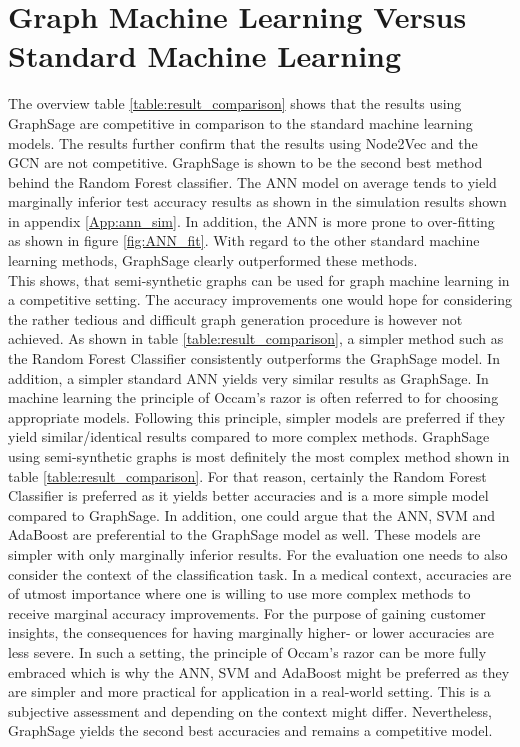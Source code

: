   \section{Graph Machine Learning Versus Standard Machine Learning}

  The overview table \ref{table:result_comparison} shows that the results using 
  GraphSage are competitive in comparison to the standard machine learning
  models. The results further confirm that the results using Node2Vec and the 
  GCN are not competitive. GraphSage is shown to be the second best method 
  behind the Random Forest classifier. The ANN model on average tends to yield 
  marginally inferior test accuracy results as shown in the simulation results 
  shown in appendix \ref{App:ann_sim}. In addition, the ANN is more prone to 
  over-fitting as shown in figure \ref{fig:ANN_fit}. With regard to the other 
  standard machine learning methods, GraphSage clearly outperformed these methods. \\

  \noindent This shows, that semi-synthetic graphs can be used for graph 
  machine learning in a competitive setting. The accuracy improvements one would 
  hope for considering the rather tedious and difficult graph generation 
  procedure is however not achieved. As shown in table 
  \ref{table:result_comparison}, a simpler method such as the Random Forest 
  Classifier consistently outperforms the GraphSage model. In addition, a
  simpler standard ANN yields very similar results as GraphSage. In machine 
  learning the principle of Occam's razor is often referred to for choosing 
  appropriate models. Following this principle, simpler models are preferred if 
  they yield similar/identical results compared to more complex methods.
  GraphSage using semi-synthetic graphs is most definitely the most complex 
  method shown in table \ref{table:result_comparison}. For that reason, certainly 
  the Random Forest Classifier is preferred as it yields better accuracies and
  is a more simple model compared to GraphSage. In addition, one could argue
  that the ANN, SVM and AdaBoost are preferential to the GraphSage model as
  well. These models are simpler with only marginally inferior results. For
  the evaluation one needs to also consider the context of the classification
  task. In a medical context, accuracies are of utmost importance where one is
  willing to use more complex methods to receive marginal accuracy improvements. 
  For the purpose of gaining customer insights, the consequences for having
  marginally higher- or lower accuracies are less severe. In such a setting,
  the principle of Occam's razor can be more fully embraced which is why the
  ANN, SVM and AdaBoost might be preferred as they are simpler and more
  practical for application in a real-world setting. This is a subjective 
  assessment and depending on the context might differ. Nevertheless, GraphSage
  yields the second best accuracies and remains a competitive model.  





